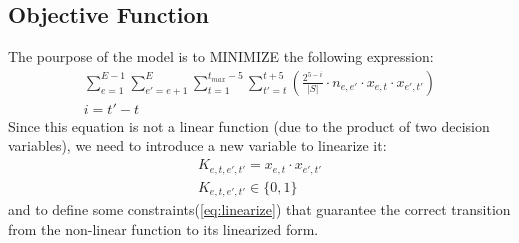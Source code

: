 \documentclass[12pt]{article}
\begin{document}
\subsection{Objective Function}
The pourpose of the model is to MINIMIZE the following expression:
\begin{equation}
  \begin{gathered}
    \sum_{e=1}^{E-1}\sum_{e'=e+1}^{E}\sum_{t=1}^{t_{max}-5}\sum_{t'=t}^{t+5} (\frac{2^{5-i}}{|S|} \cdot n_{e,e'} \cdot x_{e,t} \cdot x_{e',t'})\\
    i = t'-t
    \label{eq:fir}
  \end{gathered}
\end{equation}
Since this equation is not a linear function (due to the product of two decision variables), we need to introduce a new variable to linearize it:
\begin{equation}
  \begin{gathered}
    K_{e,t,e',t'} = x_{e,t} \cdot x_{e',t'}\\
    K_{e,t,e',t'} \in \{0,1\}
    \label{eq:sec}
  \end{gathered}
\end{equation}
and to define some constraints(\ref{eq:linearize}) that guarantee the correct transition from the non-linear function to its linearized form.
\end{document}
